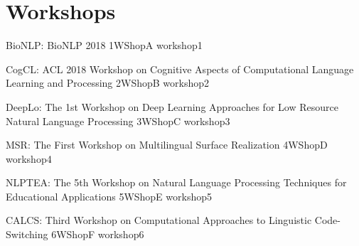 \chapter[Workshops: \daydate]{Workshops}
\thispagestyle{emptyheader}
\vfill




\clearpage
        


\begin{wsschedule}
  {BioNLP: BioNLP 2018}
  {1}{WShopA}
  {workshop1}
  {\WShopLocA}
  
\end{wsschedule}

\begin{wsschedule}
  {CogCL: ACL 2018 Workshop on Cognitive Aspects of Computational 
  Language Learning and Processing}
  {2}{WShopB}
  {workshop2}
  {\WShopLocB}
  
\end{wsschedule}

\begin{wsschedule}
  {DeepLo: The 1st Workshop on Deep Learning Approaches for Low Resource 
  Natural Language Processing}
  {3}{WShopC}
  {workshop3}
  {\WShopLocC}
  \clearpage
\end{wsschedule}

\begin{wsschedule}
  {MSR: The First Workshop on Multilingual Surface Realization}
  {4}{WShopD}
  {workshop4}
  {\WShopLocD}
  
\end{wsschedule}

\begin{wsschedule}
  {NLPTEA: The 5th Workshop on Natural Language Processing Techniques 
  for Educational Applications}
  {5}{WShopE}
  {workshop5}
  {\WShopLocE}
  
\end{wsschedule}

\begin{wsschedule}
  {CALCS: Third Workshop on Computational Approaches to Linguistic 
  Code-Switching}
  {6}{WShopF}
  {workshop6}
  {\WShopLocF}
  
\end{wsschedule}

